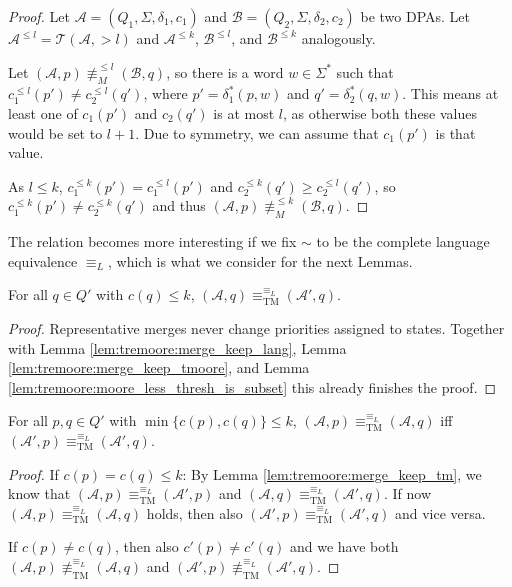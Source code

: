 \begin{proof}
	Let $\mathcal{A} = (Q_1, \Sigma, \delta_1, c_1)$ and $\mathcal{B} = (Q_2, \Sigma, \delta_2, c_2)$ be two DPAs. Let $\mathcal{A}^{\leq l} = \mathcal{T}(\mathcal{A}, > l)$ and $\mathcal{A}^{\leq k}$, $\mathcal{B}^{\leq l}$, and $\mathcal{B}^{\leq k}$ analogously.
	
	Let $(\mathcal{A}, p) \not\equiv_M^{\leq l} (\mathcal{B}, q)$, so there is a word $w \in \Sigma^*$ such that $c_1^{\leq l}(p') \neq c_2^{\leq l}(q')$, where $p' = \delta_1^*(p, w)$ and $q' = \delta_2^*(q, w)$. This means at least one of $c_1(p')$ and $c_2(q')$ is at most $l$, as otherwise both these values would be set to $l+1$. Due to symmetry, we can assume that $c_1(p')$ is that value.
	
	As $l \leq k$, $c_1^{\leq k}(p') = c_1^{\leq l}(p')$ and $c_2^{\leq k}(q') \geq c_2^{\leq l}(q')$, so $c_1^{\leq k}(p') \neq c_2^{\leq k}(q')$ and thus $(\mathcal{A}, p) \not\equiv_M^{\leq k} (\mathcal{B}, q)$.
\end{proof} 

\vspace{10pt}

The relation becomes more interesting if we fix $\sim$ to be the complete language equivalence $\equiv_L$, which is what we consider for the next Lemmas.

\begin{lem}
	For all $q \in Q'$ with $c(q) \leq k$, $(\mathcal{A}, q) \equiv^{\equiv_L}_\text{TM} (\mathcal{A}', q)$.
	\label{lem:tremoore:merge_keep_tm}
\end{lem}

\begin{proof}
	Representative merges never change priorities assigned to states. Together with Lemma \ref{lem:tremoore:merge_keep_lang}, Lemma \ref{lem:tremoore:merge_keep_tmoore}, and Lemma \ref{lem:tremoore:moore_less_thresh_is_subset} this already finishes the proof.
\end{proof}

\begin{lem}
	For all $p, q \in Q'$ with $\min \{c(p), c(q)\} \leq k$, $(\mathcal{A}, p) \equiv^{\equiv_L}_\text{TM} (\mathcal{A}, q)$ iff $(\mathcal{A}', p) \equiv^{\equiv_L}_\text{TM} (\mathcal{A}', q)$.
	\label{lem:tremoore:merge_changes_only_higher}
\end{lem}

\begin{proof}
	If $c(p) = c(q) \leq k$: By Lemma \ref{lem:tremoore:merge_keep_tm}, we know that $(\mathcal{A}, p) \equiv^{\equiv_L}_\text{TM} (\mathcal{A}', p)$ and $(\mathcal{A}, q) \equiv^{\equiv_L}_\text{TM} (\mathcal{A}', q)$. If now $(\mathcal{A}, p) \equiv^{\equiv_L}_\text{TM} (\mathcal{A}, q)$ holds, then also $(\mathcal{A}', p) \equiv^{\equiv_L}_\text{TM} (\mathcal{A}', q)$ and vice versa.
	
	If $c(p) \neq c(q)$, then also $c'(p) \neq c'(q)$ and we have both $(\mathcal{A}, p) \not\equiv^{\equiv_L}_\text{TM} (\mathcal{A}, q)$ and $(\mathcal{A}', p) \not\equiv^{\equiv_L}_\text{TM} (\mathcal{A}', q)$.
\end{proof}

